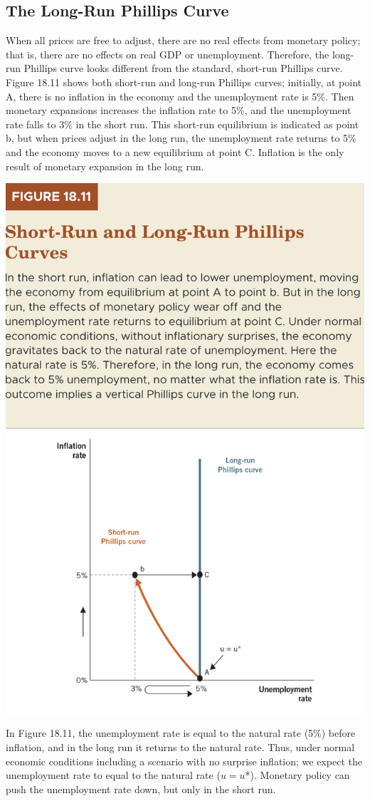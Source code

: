 \documentclass[11pt]{article} %
\begin{document}
\subsection*{The Long-Run Phillips Curve}
When all prices are free to adjust, there are no real effects from monetary policy; that is, there are no effects on real GDP or unemployment. Therefore, the long-run Phillips curve looks different from the standard, short-run Phillips curve. Figure 18.11 shows both short-run and long-run Phillips curves; initially, at point A, there is no inflation in the economy and the unemployment rate is 5\%. Then monetary expansions increases the inflation rate to 5\%, and the unemployment rate falls to 3\% in the short run. This short-run equilibrium is indicated as point b, but when prices adjust in the long run, the unemployment rate returns to 5\% and the economy moves to a new equilibrium at point C. Inflation is the only result of monetary expansion in the long run.
\begin{center}
\includegraphics[scale=0.5]{images/Figure 18.11.png} 
\end{center}
In Figure 18.11, the unemployment rate is equal to the natural rate (5\%) before inflation, and in the long run it returns to the natural rate. Thus, under normal economic conditions including a scenario with no surprise inflation; we expect the unemployment rate to equal to the natural rate ($u = u$*). Monetary policy can push the unemployment rate down, but only in the short run.
\end{document}
